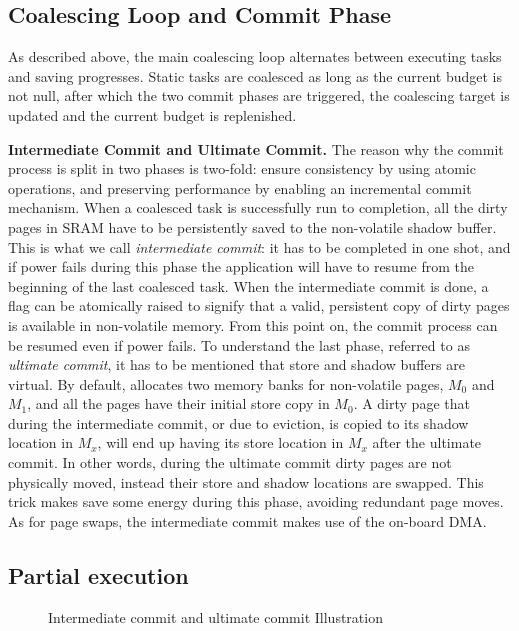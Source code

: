 
\subsection{Coalescing Loop and Commit Phase}

As described above, the main coalescing loop alternates between executing tasks and saving progresses. Static tasks are coalesced as long as the current budget is not null, after which the two commit phases are triggered, the coalescing target is updated and the current budget is replenished.

\textbf{Intermediate Commit and Ultimate Commit.} The reason why the commit process is split in two phases is two-fold: ensure consistency by using atomic operations, and preserving performance by enabling an incremental commit mechanism. When a coalesced task is successfully run to completion, all the dirty pages in SRAM have to be persistently saved to the non-volatile shadow buffer. This is what we call \emph{intermediate commit}: it has to be completed in one shot, and if power fails during this phase the application will have to resume from the beginning of the last coalesced task. When the intermediate commit is done, a flag can be atomically raised to signify that a valid, persistent copy of dirty pages is available in non-volatile memory. From this point on, the commit process can be resumed even if power fails.
To understand the last phase, referred to as \emph{ultimate commit}, it has to be mentioned that store and shadow buffers are virtual. By default, \sys allocates two memory banks for non-volatile pages, $M_0$ and $M_1$, and all the pages have their initial store copy in $M_0$. A dirty page that during the intermediate commit, or due to eviction, is copied to its shadow location in $M_x$, will end up having its store location in $M_x$ after the ultimate commit. In other words, during the ultimate commit dirty pages are not physically moved, instead their store and shadow locations are swapped. This trick makes \sys save some energy during this phase, avoiding redundant page moves. As for page swaps, the intermediate commit makes use of the on-board DMA.

\subsection{Partial execution}




\begin{figure}
	\centering
	\caption{Intermediate commit and ultimate commit Illustration }
	\label{fig:intermediate_ultimate-commit}
\end{figure}
